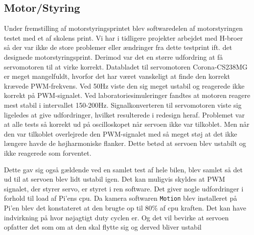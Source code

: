 \subsection{Motor/Styring} \label{sec:hwi_motor_styring}
Under fremstilling af motorstyringsprintet blev softwaredelen af motorstyringen testet med et af skolens print. 
Vi har i tidligere projekter arbejdet med H-broer så der var ikke de store problemer eller ændringer fra dette testprint ift. det designede motorstyringsprint.
Derimod var det en større udfordring at få servomotoren til at virke korrekt.  
Databladet til servomotoren Corona-CS238MG \cite{lib:Corona-CS238MG} er meget mangelfuldt, hvorfor det har været vanskeligt at finde den korrekt krævede PWM-frekvens. 
Ved 50Hz viste den sig meget ustabil og reagerede ikke korrekt på PWM-signalet. 
Ved laboratoriesimuleringer fandtes at motoren reagere mest stabil i intervallet 150-200Hz. 
Signalkonverteren til servomotoren viste sig ligeledes at give udfordringer, hvilket resulterede i redesign heraf.
Problemet var at alle tests så korrekt ud på oscilloskopet når servoen ikke var tilkoblet. 
Men når den var tilkoblet overlejrede den PWM-signalet med så meget støj at det ikke længere havde de højharmoniske flanker. 
Dette betød at servoen blev ustabilt og ikke reagerede som forventet.


Dette gav sig også gældende ved en samlet test af hele bilen, blev samlet så det ud til at servoen blev lidt ustabil igen. 
Det kan muligvis skyldes at PWM signalet, der styrer servo, er styret i ren software. 
Det giver nogle udfordringer i forhold til load af Pi'ens cpu. Da kamera softwaren \texttt{Motion} blev installeret på Pi'en blev det konstateret at den brugte op til 80\% af cpu kraften. Det kan have indvirkning på hvor nøjagtigt duty cyclen er. Og det vil bevirke at servoen opfatter det som om at den skal flytte sig og derved bliver ustabil

